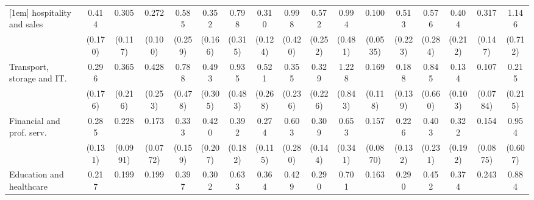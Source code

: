 {\begin{tabular}{l*{16}{c}}
[1em]
hospitality and sales&       0.414\sym{*}  &       0.305\sym{**} &       0.272\sym{***}&       0.585         &       0.352\sym{*}  &       0.798         &       0.310\sym{**} &       0.998         &       0.572         &       0.994         &       0.100\sym{***}&       0.513         &       0.576         &       0.404         &       0.317\sym{*}  &       1.146         \\
                    &     (0.170)         &     (0.117)         &     (0.100)         &     (0.259)         &     (0.166)         &     (0.315)         &     (0.124)         &     (0.420)         &     (0.252)         &     (0.481)         &    (0.0535)         &     (0.223)         &     (0.284)         &     (0.212)         &     (0.147)         &     (0.712)         \\
[1em]
Transport, storage and IT.&       0.296\sym{*}  &       0.365         &       0.428         &       0.788         &       0.493         &       0.935         &       0.521         &       0.355         &       0.329         &       1.228         &       0.169\sym{*}  &       0.188\sym{*}  &       0.845         &       0.134\sym{**} &       0.107\sym{**} &       0.215         \\
                    &     (0.176)         &     (0.216)         &     (0.253)         &     (0.478)         &     (0.305)         &     (0.483)         &     (0.268)         &     (0.236)         &     (0.226)         &     (0.843)         &     (0.118)         &     (0.139)         &     (0.660)         &     (0.103)         &    (0.0784)         &     (0.215)         \\
[1em]
Financial and prof. serv.&       0.285\sym{**} &       0.228\sym{***}&       0.173\sym{***}&       0.333\sym{*}  &       0.420         &       0.392\sym{*}  &       0.274\sym{**} &       0.603         &       0.309\sym{*}  &       0.653         &       0.157\sym{***}&       0.226\sym{*}  &       0.403         &       0.322         &       0.154\sym{***}&       0.954         \\
                    &     (0.131)         &    (0.0991)         &    (0.0772)         &     (0.159)         &     (0.207)         &     (0.182)         &     (0.115)         &     (0.280)         &     (0.144)         &     (0.341)         &    (0.0870)         &     (0.132)         &     (0.231)         &     (0.192)         &    (0.0875)         &     (0.607)         \\
[1em]
Education and healthcare&       0.217\sym{***}&       0.199\sym{***}&       0.199\sym{***}&       0.397\sym{*}  &       0.302\sym{*}  &       0.633         &       0.364\sym{*}  &       0.429         &       0.290\sym{*}  &       0.701         &       0.163\sym{***}&       0.290\sym{*}  &       0.452         &       0.374         &       0.243\sym{**} &       0.884         \\

\end{tabular}}
